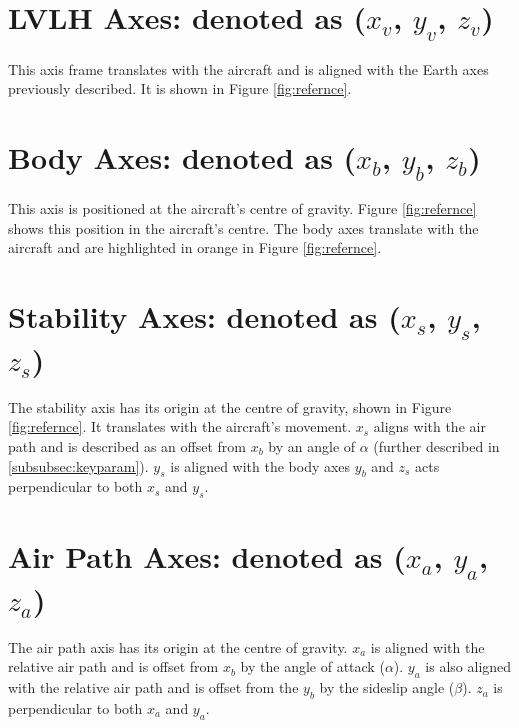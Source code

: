 \section{LVLH Axes: denoted as \texorpdfstring{($x_v$, $y_v$, $z_v$)}{L}}
 This axis frame translates with the aircraft and is aligned with the Earth axes previously described. It is shown in Figure \ref{fig:refernce}.

\section{Body Axes: denoted as \texorpdfstring{($x_b$, $y_b$, $z_b$)}{L}} 
This axis is positioned at the aircraft's centre of gravity. Figure \ref{fig:refernce} shows this position in the aircraft's centre. The body axes translate with the aircraft and are highlighted in orange in Figure \ref{fig:refernce}.

\section{Stability Axes: denoted as \texorpdfstring{($x_s$, $y_s$, $z_s$)}{L}} 
The stability axis has its origin at the centre of gravity, shown in Figure \ref{fig:refernce}. It translates with the aircraft's movement. $x_s$ aligns with the air path and is described as an offset from $x_b$ by an angle of $\alpha$ (further described in \ref{subsubsec:keyparam}). $y_s$ is aligned with the body axes $y_b$ and $z_s$ acts perpendicular to both $x_s$ and $y_s$.


\section{Air Path Axes: denoted as \texorpdfstring{($x_a$, $y_a$, $z_a$)}{L}}
The air path axis has its origin at the centre of gravity. $x_a$ is aligned with the relative air path and is offset from $x_b$ by the angle of attack ($\alpha$). $y_a$ is also aligned with the relative air path and is offset from the $y_b$ by the sideslip angle ($\beta$). $z_a$ is perpendicular to both $x_a$ and $y_a$. 

